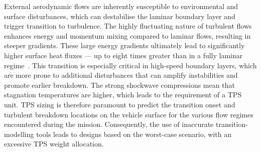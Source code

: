External aerodynamic flows are inherently susceptible to environmental and surface disturbances, which can destabilise the laminar boundary layer and trigger transition to turbulence. The highly fluctuating nature of turbulent flows enhances energy and momentum mixing compared to laminar flows, resulting in steeper gradients. These large energy gradients ultimately lead to significantly higher surface heat fluxes — up to eight times greater than in a fully laminar regime~\citep{VanDriest1952}. This transition is especially critical in high-speed boundary layers, which are more prone to additional disturbances that can amplify instabilities and promote earlier breakdown. The strong shockwave compressions mean that stagnation temperatures are higher, which leads to the requirement of a \gls{TPS} unit. \gls{TPS} sizing is therefore paramount to predict the transition onset and turbulent breakdown locations on the vehicle surface for the various flow regimes encountered during the mission. Consequently, the use of inaccurate transition-modelling tools leads to designs based on the worst-case scenario, with an excessive \gls{TPS} weight allocation.


